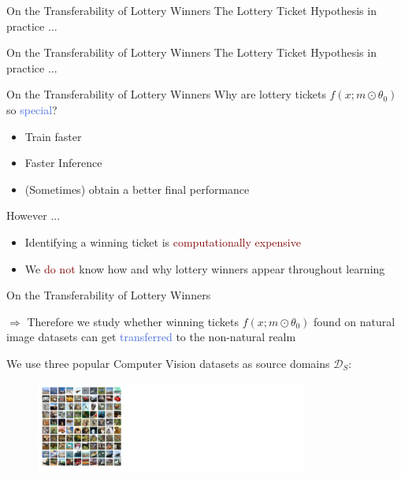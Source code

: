 \documentclass{beamer}
\begin{document}
\begin{frame}{On the Transferability of Lottery Winners}
	The Lottery Ticket Hypothesis in practice ...

	
\end{frame}



\begin{frame}{On the Transferability of Lottery Winners}
	The Lottery Ticket Hypothesis in practice ...

	
\end{frame}

\begin{frame}{On the Transferability of Lottery Winners}
	Why are lottery tickets $f(x;m \odot \theta_0)$ so \textcolor{RoyalBlue}{special}?
	\begin{itemize}
		\item Train faster
		\item Faster Inference
		\item (Sometimes) obtain a better final performance
	\end{itemize}

	However ... 

	\begin{itemize}
		\item Identifying a winning ticket is \textcolor{Maroon}{computationally expensive} 
		\item We \textcolor{Maroon}{do not} know how and why lottery winners appear throughout learning
	\end{itemize}
\end{frame}

\begin{frame}{On the Transferability of Lottery Winners}

	$\Rightarrow$ Therefore we study whether winning tickets $f(x;m \odot \theta_0)$
	found on natural image datasets can get \textcolor{RoyalBlue}{transferred} to the non-natural realm

	\bigskip

	We use three popular Computer Vision datasets as source domains $\mathcal{D}_S$:

	\begin{figure}
 \includegraphics[width=0.8\textwidth]{figures/cifar10}
\end{figure}
\end{frame}
\end{document}
